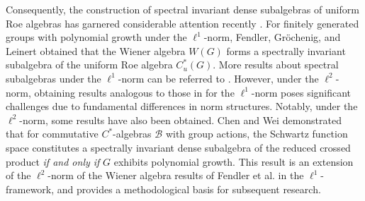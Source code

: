 \documentclass[preprint,11pt]{elsarticle}
\numberwithin{equation}{section}
\begin{document}
	Consequently, the construction of spectral invariant dense subalgebras of uniform Roe algebras has garnered considerable attention recently \cite{ER2009,GKM2006,KK2010,KM2006,N1999,LB1992}.
	For finitely generated groups with polynomial growth under the $\ell^1$-norm, Fendler, Gr\"{o}chenig, and Leinert \cite{GKM2008} obtained that the Wiener algebra \( W(G) \) forms a spectrally invariant subalgebra of the uniform Roe algebra \( C_u^*(G) \). More results about spectral subalgebras under the $\ell^1$-norm can be referred to \cite{AG1997,GKM2006,K2004,KM2006,KW2004}. However, under the $\ell^
	2$-norm, obtaining results analogous to those in \cite{GKM2008} for the $\ell^1$-norm poses significant challenges due to fundamental differences in norm structures.
	Notably, under the $\ell^2$-norm, some results have also been obtained. 
	Chen and Wei \cite{CW2003} demonstrated that for commutative \( C^*\)-algebras \( \mathcal{B} \) with group actions, the Schwartz function space constitutes a spectrally invariant dense subalgebra of the reduced crossed product \textit{if and only if} \( G \) exhibits polynomial growth. This result is an extension of the $\ell^2$-norm of the Wiener algebra results of Fendler et al. \cite{GKM2008} in the $\ell^1$-framework, and provides a methodological basis for subsequent research. 
\end{document}
